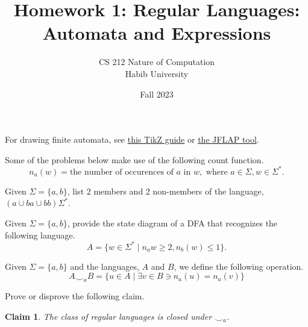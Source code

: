 \documentclass[addpoints]{exam}
\title{Homework 1: Regular Languages: Automata and Expressions}
\author{CS 212 Nature of Computation\\Habib University}
\date{Fall 2023}
\theoremstyle{claim}
\newtheorem{claim}{Claim}
\begin{document}
\maketitle


For drawing finite automata, see  \href{https://www3.nd.edu/~kogge/courses/cse30151-fa17/Public/other/tikz_tutorial.pdf}{this TikZ guide} or \href{https://www.jflap.org}{the JFLAP tool}.

Some of the problems below make use of the following count function.
\[
    n_a(w) =  \text{the number of occurences of } a\text{ in } w, \text{ where } a\in\Sigma,w\in\Sigma^*.
\]

\begin{questions}

\question Given $\Sigma=\{a,b\}$, list 2 members and 2 non-members of the language, $(a \cup ba \cup bb)\Sigma^*$.

\question Given $\Sigma=\{a,b\}$, provide the state diagram of a DFA that recognizes the following language.
  \[
    A=\{w\in\Sigma^* \mid n_a{w} \ge 2, n_b(w) \le 1\}.
  \]

\question Given $\Sigma=\{a,b\}$ and the languages, $A$ and $B$, we define the following operation.
  \[
    A\smile_a B = \{ u\in A \mid \exists v\in B \ni n_a(u) = n_a(v) \}
  \]

  Prove or disprove the following claim.
  \begin{claim}
    The class of regular languages is closed under $\smile_a$.
  \end{claim}

  
  

\end{questions}
\end{document}
